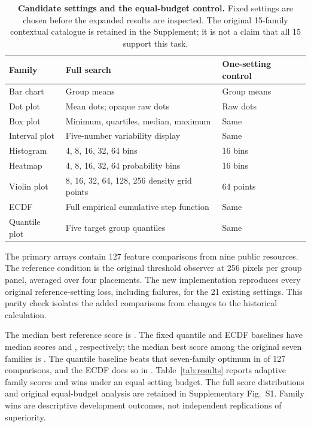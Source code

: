 \documentclass[11pt]{article}
\begin{document}
\begin{table}[ht]\centering\small
\caption{\textbf{Candidate settings and the equal-budget control.} Fixed settings are chosen before the expanded results are inspected. The original 15-family contextual catalogue is retained in the Supplement; it is not a claim that all 15 support this task.}\label{tab:settings}
\begin{tabular}{p{3.1cm}p{6.2cm}p{4.2cm}}\toprule
Family & Full search & One-setting control\\\midrule
Bar chart & Group means & Group means\\
Dot plot & Mean dots; opaque raw dots & Raw dots\\
Box plot & Minimum, quartiles, median, maximum & Same\\
Interval plot & Five-number variability display & Same\\
Histogram & 4, 8, 16, 32, 64 bins & 16 bins\\
Heatmap & 4, 8, 16, 32, 64 probability bins & 16 bins\\
Violin plot & 8, 16, 32, 64, 128, 256 density grid points & 64 points\\
ECDF & Full empirical cumulative step function & Same\\
Quantile plot & Five target group quantiles & Same\\\bottomrule
\end{tabular}
\end{table}

The primary arrays contain 127 feature comparisons from nine public resources.\cite{wdbc,heart,failure,kidney,liver,retina,har,bidmc,wrist} The reference condition is the original threshold observer at 256 pixels per group panel, averaged over four placements. The new implementation reproduces every original reference-setting loss, including failures, for the 21 existing settings. This parity check isolates the added comparisons from changes to the historical calculation.

The median best reference score is \BestMedian{}. The fixed quantile and ECDF baselines have median scores \QuantileMedian{} and \ECDFMedian{}, respectively; the median best score among the original seven families is \LegacyMedian{}. The quantile baseline beats that seven-family optimum in \QuantileBetter{} of 127 comparisons, and the ECDF does so in \ECDFBetter{}. Table~\ref{tab:results} reports adaptive family scores and wins under an equal setting budget. The full score distributions and original equal-budget analysis are retained in Supplementary Fig.~S1. Family wins are descriptive development outcomes, not independent replications of superiority.
\end{document}
